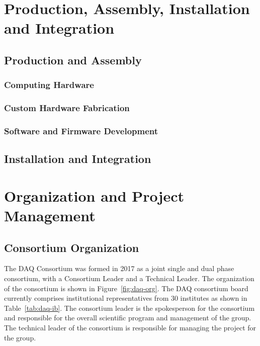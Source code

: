 \section{Production, Assembly, Installation and Integration}
\label{sec:sp-daq:production}


\subsection{Production and Assembly}

\subsubsection{Computing Hardware}

\subsubsection{Custom Hardware Fabrication}

\subsubsection{Software and Firmware Development}

\subsection{Installation and Integration}


\section{Organization and Project Management}
\label{sec:sp-daq:organization}

\subsection{Consortium Organization}

The DAQ Consortium was formed in 2017 as a joint single and
dual phase consortium, with a Consortium Leader and a Technical
Leader. The organization of the consortium is shown in
Figure~\ref{fig:daq-org}. The DAQ consortium board currently comprises
institutional representatives from 30 institutes as shown in Table~\ref{tab:daq-ib}. The consortium leader is the spokesperson for the consortium and
responsible for the overall scientific program and management of the
group. The technical leader of the consortium is responsible for
managing the project for the group.

